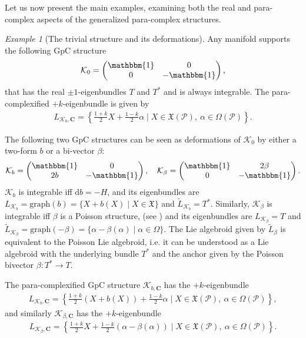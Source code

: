 \documentclass[letterpaper,12pt]{article}
\newcommand{\KK}{\mathcal{K}}
\newcommand{\Cc}{\mathbf{C}}
\newcommand{\XX}{\mathfrak{X}}
\newcommand{\id}{\mathbbm{1}}
\newcommand{\PS}{\mathcal{P}}
\newcommand{\ap}{\alpha}
\newcommand{\bt}{\beta}
\newcommand{\rd}{\mathrm{d}}
\theoremstyle{definition}
\theoremstyle{remark}
\theoremstyle{examples}
\newtheorem{Ex}[theorem]{Example}
\begin{document}
Let us now present the main examples, examining both the real and para-complex aspects of the generalized para-complex structures.

\begin{Ex}[The trivial structure and its deformations]\label{ex:GpC_trivial}
Any manifold supports the following GpC structure
\begin{align*}
\KK_0=
\begin{pmatrix}
\id & 0 \\
0 & -\id
\end{pmatrix},
\end{align*}
that has the real $\pm 1$-eigenbundles $T$ and $T^*$ and is always integrable. The para-complexified $+k$-eigenbundle is given by
\begin{align*}
L_{\KK_0,\Cc}=\left\{\frac{1+k}{2}X+\frac{1-k}{2}\ap\mid X\in\XX(\PS),\ \ap \in \Omega(\PS)\right\}.
\end{align*}

 The following two GpC structures can be seen as deformations of $\KK_0$ by either a two-form $b$ or a bi-vector $\beta$:
\begin{align*}
\KK_b=
\begin{pmatrix}
\id & 0 \\
2b & -\id
\end{pmatrix},\quad
\KK_\beta=
\begin{pmatrix}
\id & 2\beta \\
0 & -\id
\end{pmatrix}.
\end{align*} 
$\KK_b$ is integrable iff $\rd b =-H$, and its eigenbundles are $L_{\KK_b} = \text{graph}(b)=\{X+b(X)\mid X \in \XX\}$ and $\widetilde{L}_{\KK_b} =T^*$. Similarly, $\KK_\beta$ is integrable iff $\beta$ is a Poisson structure, (see \cite[Lemma~2.13]{Hu:2019zro}) and its eigenbundles are $L_{\KK_\beta} =T$ and $\widetilde{L}_{\KK_\beta} =\text{graph}(-\beta)=\{\ap-\beta(\ap)\mid \ap \in \Omega\}$.
The Lie algebroid given by $\widetilde{L}_{\beta}$ is equivalent to the Poisson Lie algebroid, i.e. it can be understood as a Lie algebroid with the underlying bundle $T^*$ and the anchor given by the Poisson bivector $\beta : T^* \to T$.

The para-complexified GpC structure $\KK_{b,\Cc}$ has the $+k$-eigenbundle
\begin{align*}
L_{\KK_b,\Cc}=\left\{\frac{1+k}{2}(X+b(X))+\frac{1-k}{2}\ap\mid X\in\XX(\PS),\ \ap \in \Omega(\PS)\right\},
\end{align*}
and similarly $\KK_{\bt,\Cc}$ has the $+k$-eigenbundle
\begin{align*}
L_{\KK_\bt,\Cc}=\left\{\frac{1+k}{2}X+\frac{1-k}{2}(\ap-\bt(\ap))\mid X\in\XX(\PS),\ \ap \in \Omega(\PS)\right\}.
\end{align*}
\end{Ex}
\end{document}
